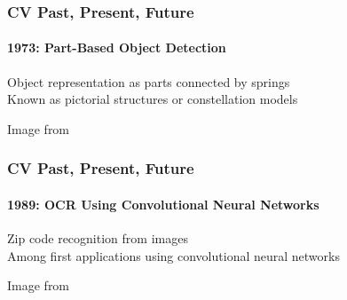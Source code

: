 \documentclass[xetex,professionalfont]{beamer}
\begin{document}
\begin{frame}
\frametitle{CV Past, Present, Future}
\framesubtitle{1973: Part-Based Object Detection}

Object representation as parts connected by springs\\\medskip %
Known as pictorial structures or constellation models %

\bigskip
\begin{center}
    {\centering Image from \cite{fischler1973}}
\end{center}

\end{frame}


\begin{frame}
\frametitle{CV Past, Present, Future}
\framesubtitle{1989: OCR Using Convolutional Neural Networks}


Zip code recognition from images\\\medskip %
Among first applications using convolutional neural networks %

\bigskip
\begin{center}
    {\centering Image from \cite{lecun1989}}
\end{center}

\end{frame}
\end{document}
